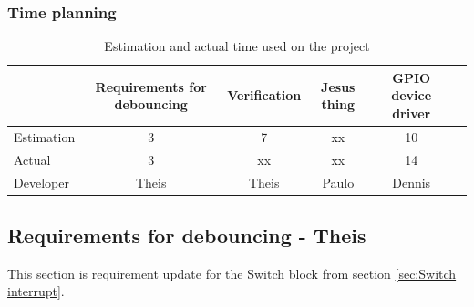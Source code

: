 \subsubsection{Time planning}

\begin{table}[H]
\centering
	\begin{tabular}{|l|c|c|c|c|c|}
		\hline
		~			& Requirements for debouncing	& Verification			& Jesus thing		& GPIO device driver	\\ \hline
		Estimation	& 3							& 7					& xx				& 10			\\
		Actual		& 3 							& xx					& xx				& 14			\\
		Developer	& Theis						& Theis				& Paulo			& Dennis		\\
		\hline
	\end{tabular}
	\caption{Estimation and actual time used on the project}
\end{table}
\subsection{Requirements for debouncing - Theis}
%
This section is requirement update for the Switch block from section \ref{sec:Switch interrupt}.
